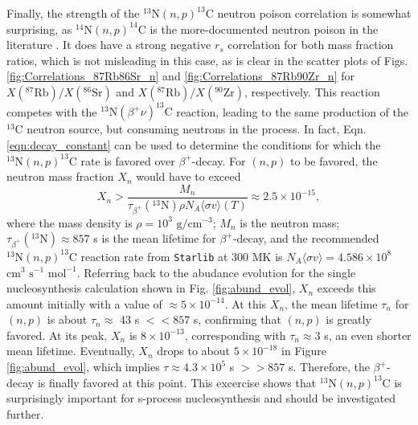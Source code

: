 Finally, the strength of the $^{13}\mathrm{N}(n,p)^{13}\mathrm{C}$ neutron poison correlation is somewhat surprising, as $^{14}\mathrm{N}(n,p)^{14}\mathrm{C}$ is the more-documented neutron poison in the literature \cite{Habing2004}. It does have a strong negative $r_{s}$ correlation for both mass fraction ratios, which is not misleading in this case, as is clear in the scatter plots of Figs. \ref{fig:Correlations_87Rb86Sr_n} and \ref{fig:Correlations_87Rb90Zr_n} for $X(^{87}\mathrm{Rb})/X(^{86}\mathrm{Sr})$ and $X(^{87}\mathrm{Rb})/X(^{90}\mathrm{Zr})$, respectively. This reaction competes with the $^{13}\mathrm{N}(\beta^{+}\nu)^{13}\mathrm{C}$ reaction, leading to the same production of the $^{13}$C neutron source, but consuming neutrons in the process. In fact, Eqn. \ref{eqn:decay_constant} can be used to determine the conditions for which the $^{13}\mathrm{N}(n,p)^{13}\mathrm{C}$ rate is favored over $\beta^{+}$-decay. For $(n,p)$ to be favored, the neutron mass fraction $X_{n}$ would have to exceed
\begin{equation} \label{eqn:n_mass_frac_condition}
X_{n} > \frac{M_{n}}{\tau_{\beta^{+}}(^{13}\mathrm{N}) \rho N_{A} \langle \sigma v \rangle(T)} \approx 2.5 \times 10^{-15},
\end{equation}
where the mass density is $\rho = 10^{3}$ $\mathrm{g}/\mathrm{cm}^{-3}$; $M_{n}$ is the neutron mass; $\tau_{\beta^{+}}(^{13}\mathrm{N}) \approx 857$ s \cite{Audi2003} is the mean lifetime for $\beta^{+}$-decay, and the recommended $^{13}\mathrm{N}(n,p)^{13}\mathrm{C}$ reaction rate from \texttt{Starlib} at 300 MK is $N_{A} \langle \sigma v \rangle = 4.586 \times 10^{8}$ $\mathrm{cm}^{3}$ $\mathrm{s}^{-1}$ $\mathrm{mol}^{-1}$. Referring back to the abudance evolution for the single nucleosynthesis calculation shown in Fig. \ref{fig:abund_evol}, $X_{n}$ exceeds this amount initially with a value of $\approx 5 \times 10^{-14}$. At this $X_{n}$, the mean lifetime $\tau_{n}$ for $(n,p)$ is about $\tau_{n} \approx$ 43 s $<< 857$ s, confirming that $(n,p)$ is greatly favored. At its peak, $X_{n}$ is $8 \times 10^{-13}$, corresponding with $\tau_{n} \approx 3$ s, an even shorter mean lifetime. Eventually, $X_{n}$ drops to about $5 \times 10^{-18}$ in Figure \ref{fig:abund_evol}, which implies $\tau \approx 4.3 \times 10^{5}$ s $>> 857$ s. Therefore, the $\beta^{+}$-decay is finally favored at this point. This excercise shows that $^{13}\mathrm{N}(n,p)^{13}\mathrm{C}$ is surprisingly important for s-process nucleosynthesis and should be investigated further.

